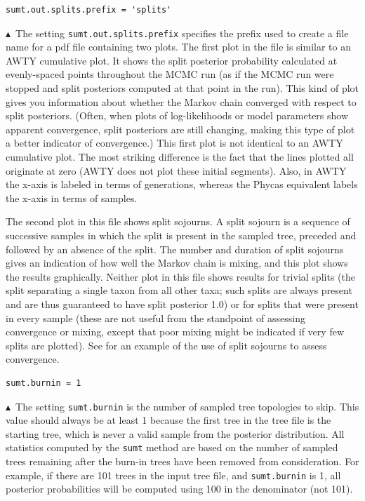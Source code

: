 \documentclass[10pt]{article}
\newcommand{\cmd}[1]{{\tt \small #1}\index{#1}}	%
\newcommand{\opt}[2]{{\tt \small #1.#2}\index{#1!#2}}	%
\newcommand{\pointup}{$\blacktriangle$}
\begin{document}
\begin{samepage}
\begin{verbatim}
sumt.out.splits.prefix = 'splits'
\end{verbatim}
\pointup\ The setting \opt{sumt}{out.splits.prefix} specifies the prefix used to create a file name for a pdf file containing two plots. The first plot in the file is similar to an AWTY \citep[][\url{http://king2.scs.fsu.edu/CEBProjects/awty/awty_start.php}]{Nylander:2008p471} cumulative plot. It shows the split posterior probability calculated at evenly-spaced points throughout the MCMC run (as if the MCMC run were stopped and split posteriors computed at that point in the run). This kind of plot gives you information about whether the Markov chain converged with respect to split posteriors. (Often, when plots of log-likelihoods or model parameters show apparent convergence, split posteriors are still changing, making this type of plot a better indicator of convergence.) This first plot is not identical to an AWTY cumulative plot. The most striking difference is the fact that the lines plotted all originate at zero (AWTY does not plot these initial segments). Also, in AWTY the x-axis is labeled in terms of generations, whereas the Phycas equivalent labels the x-axis in terms of samples. 

The second plot in this file shows split sojourns. A split sojourn is a sequence of successive samples in which the split is present in the sampled tree, preceded and followed by an absence of the split. The number and duration of split sojourns gives an indication of how well the Markov chain is mixing, and this plot shows the results graphically. Neither plot in this file shows results for trivial splits (the split separating a single taxon from all other taxa; such splits are always present and are thus guaranteed to have split posterior 1.0) or for splits that were present in every sample (these are not useful from the standpoint of assessing convergence or mixing, except that poor mixing might be indicated if very few splits are plotted). See \citet{LewisLewis2005} for an example of the use of split sojourns to assess convergence. 
\end{samepage}

\begin{samepage}
\begin{verbatim}
sumt.burnin = 1
\end{verbatim}
\pointup\ The setting \opt{sumt}{burnin} is the number of sampled tree topologies to skip. This value should always be at least 1 because the first tree in the tree file is the starting tree, which is never a valid sample from the posterior distribution. All statistics computed by the \cmd{sumt} method are based on the number of sampled trees remaining after the burn-in trees have been removed from consideration. For example, if there are 101 trees in the input tree file, and \opt{sumt}{burnin} is 1, all posterior probabilities will be computed using 100 in the denominator (not 101).
\end{samepage}
\end{document}
